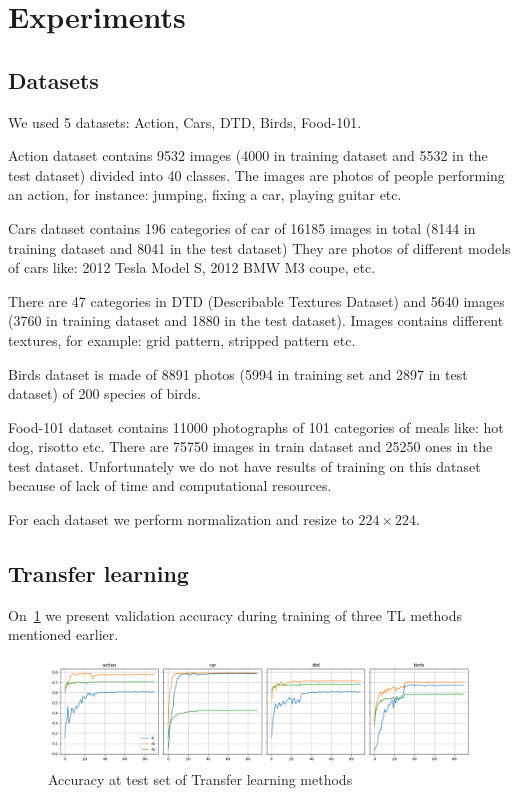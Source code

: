 \documentclass[12pt]{article}
\begin{document}
    \section{Experiments}

    \subsection{Datasets}

    We used 5 datasets: Action, Cars, DTD, Birds, Food-101.

    Action dataset contains 9532 images (4000 in training dataset and 5532 in the test dataset) divided into 40 classes.
    The images are photos of people performing an action, for instance: jumping, fixing a car, playing guitar etc.

    Cars dataset contains 196 categories of car of 16185 images in total (8144 in training dataset and 8041 in the test dataset)
    They are photos of different models of cars like: 2012 Tesla Model S, 2012 BMW M3 coupe, etc.

    There are 47 categories in DTD (Describable Textures Dataset) and 5640 images (3760 in training dataset and 1880 in the test dataset).
    Images contains different textures, for example: grid pattern, stripped pattern etc.

    Birds dataset is made of 8891 photos (5994 in training set and 2897 in test dataset) of 200 species of birds.

    Food-101 dataset contains 11000 photographs of 101 categories of meals like: hot dog, risotto etc.
    There are 75750 images in train dataset and 25250 ones in the test dataset.
    Unfortunately we do not have results of training on this dataset because of lack of time and computational resources.

    For each dataset we perform normalization and resize to $224\times224$.

    \subsection{Transfer learning}

    On~\ref{fig:valacc_tl} we present validation accuracy during training of three TL methods mentioned earlier.
    \begin{figure}
        \centering
        \includegraphics[width=\linewidth]{valacc}
        \caption{Accuracy at test set of Transfer learning methods}
        \label{fig:valacc_tl}
    \end{figure}
\end{document}
